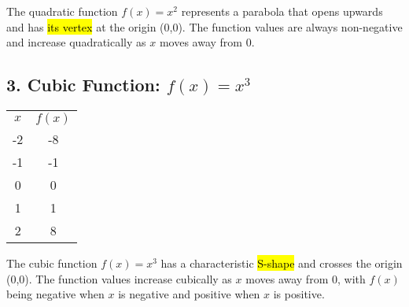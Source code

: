 \documentclass[12pt,a4paper]{article}
\begin{document}
The quadratic function $f(x) = x^2$ represents a parabola that opens upwards and has \hl{its vertex} at the origin (0,0). The function values are always non-negative and increase quadratically as $x$ moves away from 0.

\subsection*{3. Cubic Function: $f(x) = x^3$}
\begin{minipage}{0.5\textwidth}
\end{minipage}
\hspace{1cm}
\begin{minipage}{0.4\textwidth}
\centering
\begin{tabular}{cc}

$x$ & $f(x)$ \\

-2 & -8 \\
-1 & -1 \\
0 & 0 \\
1 & 1 \\
2 & 8 \\
\end{tabular}
\end{minipage}

The cubic function $f(x) = x^3$ has a characteristic \hl{S-shape} and crosses the origin (0,0). The function values increase cubically as $x$ moves away from 0, with $f(x)$ being negative when $x$ is negative and positive when $x$ is positive.
\end{document}
